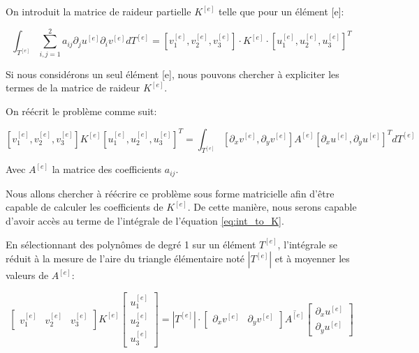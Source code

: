 \documentclass{article}
\begin{document}
On introduit la matrice de raideur partielle
$K^{[e]}$ telle que pour un élément [e]:

\begin{equation}
    \int_{T^{[e]}} \sum_{i,j=1}^2 a_{ij} \partial_j u ^{[e]}
     \partial_i v^{[e]} dT^{[e]} 
     = \left[ v_1^{[e]}, v_2^{[e]},  v_3^{[e]} \right] \cdot K^{[e]}
     \cdot \left[ u_1^{[e]}, u_2^{[e]}, u_3^{[e]} \right]^T
    \label{eq:int_to_K}
\end{equation}

Si nous considérons un seul élément [e], nous pouvons chercher à expliciter
les termes de la matrice de raideur $K^{[e]}$.

On réécrit le problème comme suit:

\begin{equation}
    \left[ v_1^{[e]}, v_2^{[e]},  v_3^{[e]} \right] K^{[e]}
     \left[ u_1^{[e]}, u_2^{[e]}, u_3^{[e]} \right]^T
     = \int_{T^{[e]}} \left[\partial_x v^{[e]},
     \partial_y v^{[e]}\right] A^{[e]} \left[\partial_x u^{[e]},
     \partial_y u^{[e]}\right]^T dT^{[e]}
\end{equation}

Avec $A^{[e]}$ la matrice des coefficients $a_{ij}$.

Nous allons chercher à réécrire ce problème sous forme matricielle
afin d'être capable de calculer les coefficients de $K^{[e]}$.
De cette manière, nous serons capable d'avoir accès au terme
de l'intégrale de l'équation \ref{eq:int_to_K}.

En sélectionnant des polynômes de degré 1 sur un élément $T^{[e]}$,
l'intégrale se réduit à la mesure de l'aire du triangle élémentaire
noté $|T^{[e]}|$ et à moyenner les valeurs de $A^{[e]}$:

\begin{equation}
    \begin{bmatrix}
        v_1^{[e]} & v_2^{[e]} &  v_3^{[e]}
    \end{bmatrix}
    K^{[e]}
    \begin{bmatrix}
        u_1^{[e]} \\ u_2^{[e]} \\ u_3^{[e]}
    \end{bmatrix}
     = |T^{[e]}| \cdot
    \begin{bmatrix}
        \partial_x v^{[e]} & \partial_y v^{[e]}
    \end{bmatrix}
    \overline{A^{[e]}}
    \begin{bmatrix}
        \partial_x u^{[e]} \\ \partial_y u^{[e]}
    \end{bmatrix}
    \label{eq:vKu_eq}
\end{equation}
\end{document}
